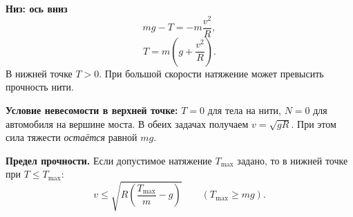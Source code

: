 \documentclass[a4paper,11pt]{article}
\begin{document}
\begin{minipage}[t]{.48\linewidth}
\textcolor{darkaccent}{\textbf{Низ: ось вниз}}
\[
mg-T=-m\frac{v^2}{R},
\]
\[
\boxed{T=m\left(g+\frac{v^2}{R}\right)}.
\]
В нижней точке $T>0$. При большой скорости натяжение может превысить прочность нити.
\end{minipage}
\par\vspace{0.65em}
\textbf{Условие невесомости в верхней точке:} $T=0$ для тела на нити, $N=0$ для автомобиля на вершине моста. В обеих задачах получаем $v=\sqrt{gR}$. При этом сила тяжести \textit{остаётся} равной $mg$.

\textbf{Предел прочности.} Если допустимое натяжение $T_{\max}$ задано, то в нижней точке при $T\le T_{\max}$:
\[
\boxed{v\le \sqrt{R\left(\frac{T_{\max}}{m}-g\right)}}
\qquad (T_{\max}\ge mg).
\]
\clearpage
\end{document}
